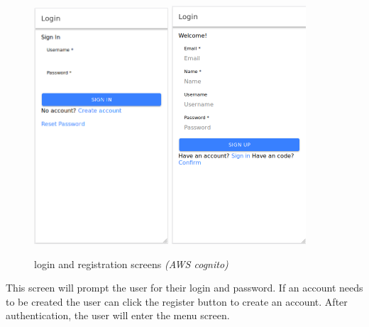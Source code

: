 \documentclass[a4paper,10pt]{article}
\begin{document}
            \begin{figure}[H]
            \centering
            \includegraphics[width=50mm, scale=1]{loginScreen}
            \includegraphics[width=50mm, scale=1]{signup}
            \caption{login and registration screens \textit{(AWS cognito)}}
            \end{figure}
            
            This screen will prompt the user for their login and password. If an account needs to be created the user can click the register button to create an account. After authentication, the user will enter the menu screen. 
            
\end{document}

